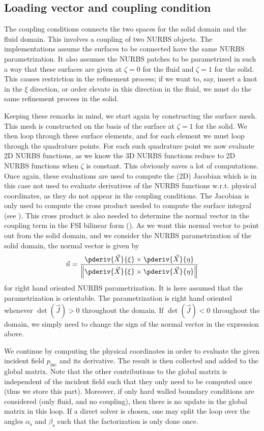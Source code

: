 \subsection{Loading vector and coupling condition}
The coupling conditions connects the two spaces for the solid domain and the fluid domain. This involves a coupling of two NURBS objects. The implementations assume the surfaces to be connected have the same NURBS parametrization. It also assumes the NURBS patches to be parametrized in such a way that these surfaces are given at $\zeta=0$ for the fluid and $\zeta =1$ for the solid. This causes restriction in the refinement process; if we want to, say, insert a knot in the $\xi$ direction, or order elevate in this direction in the fluid, we must do the same refinement process in the solid.

Keeping these remarks in mind, we start again by constructing the surface mesh. This mesh is constructed on the basis of the surface at $\zeta=1$ for the solid. We then loop through these surface elements, and for each element we must loop through the quadrature points. For each such quadrature point we now evaluate 2D NURBS functions, as we know the 3D NURBS functions reduce to 2D NURBS functions when $\zeta$ is constant. This obviously saves a lot of computations. Once again, these evaluations are used to compute the (2D) Jacobian which is in this case not used to evaluate derivatives of the NURBS functions w.r.t. physical coordinates, as they do not appear in the coupling conditions. The Jacobian is only used to compute the cross product needed to compute the surface integral (see ). This cross product is also needed to determine the normal vector in the coupling term in the FSI bilinear form (). As we want this normal vector to point out from the solid domain, and we consider the NURBS parametrization of the solid domain, the normal vector is given by
\begin{equation*}
	\vec{n} = \frac{\pderiv{\vec{X}}{\xi}\times\pderiv{\vec{X}}{\eta}}{\left\| \pderiv{\vec{X}}{\xi}\times\pderiv{\vec{X}}{\eta}\right\|}
\end{equation*}
for right hand oriented NURBS parametrization. It is here assumed that the parametrization is orientable. The parametrization is right hand oriented whenever $\det(\vec{J})>0$ throughout the domain. If $\det(\vec{J})<0$ throughout the domain, we simply need to change the sign of the normal vector in the expression above.

We continue by computing the physical coordinates in order to evaluate the given incident field $p_{\mathrm{inc}}$ and its derivative. The result is then collected and added to the global matrix. Note that the other contributions to the global matrix is independent of the incident field such that they only need to be computed once (thus we store this part). Moreover, if only hard walled boundary conditions are considered (only fluid, and no coupling), then there is no update in the global matrix in this loop. If a direct solver is chosen, one may split the loop over the angles $\alpha_{\mathrm{s}}$ and $\beta_{\mathrm{s}}$ such that the factorization is only done once. 

